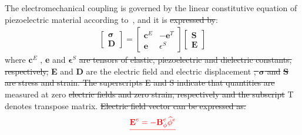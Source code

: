 \documentclass[materials,article,submit,moreauthors,pdftex]{Definitions/mdpi}
\providecommand{\DIFadd}[1]{{\protect\color{blue}{#1}}} %
\providecommand{\DIFdel}[1]{{\protect\color{red}\sout{#1}}}                      %
\providecommand{\DIFaddbegin}{} %
\providecommand{\DIFaddend}{} %
\providecommand{\DIFdelbegin}{} %
\providecommand{\DIFdelend}{} %
\begin{document}
The electromechanical coupling is governed by the linear constitutive equation of piezoelectric material according to~\cite{giurgiutiumicromechatronics, rekatsinas2017cubic}, and it is \DIFdelbegin \DIFdel{expressed by}\DIFdelend \DIFaddbegin \DIFadd{defined as}\DIFaddend :
\begin{eqnarray}
\left [ 
\begin {array}{c}
\boldsymbol{\sigma}\\
\textbf{D}
\end{array}\right ]=
\left [ 
\begin{array}{cc}
\textbf{c}^E & -\textbf{e}^T \\
\textbf{e} & \epsilon^S 
\end{array} \right ]
\left[ 
\begin{array}{c}
\textbf{S}\\
\textbf{E} 
\end{array} \right ]
\end{eqnarray}
where \(\textbf{c}^E\) \DIFaddbegin \DIFadd{is the stiffness coefficients measured at zero electric field}\DIFaddend , \textbf{e} \DIFaddbegin \DIFadd{is the piezoelectric coupling tensor }\DIFaddend and \(\boldsymbol{\epsilon}^S\) \DIFdelbegin \DIFdel{are tensors of elastic, piezoelectric and dielectric constants, respectively, }\DIFdelend \DIFaddbegin \DIFadd{electric permittivity, }\DIFaddend \textbf{E} and \textbf{D} are the electric field and electric displacement \DIFdelbegin \DIFdel{, \(\boldsymbol{\sigma}\) and }\textbf{\DIFdel{S}} %
\DIFdel{are stress and strain.
The superscripts E and S indicate that quantities are }\DIFdelend measured at zero \DIFdelbegin \DIFdel{electric fields and zero strain, respectively and the subscript }\DIFdelend \DIFaddbegin \DIFadd{strain.
The superscript }\DIFaddend T denotes transpose matrix.
\DIFdelbegin \DIFdel{Electric field vector can be expressed as:
}\begin{eqnarray*}
\DIFdel{\textbf{E}^e=-\textbf{B}_\phi^e \widehat{\phi}^e
}\end{eqnarray*}%
\end{document}
